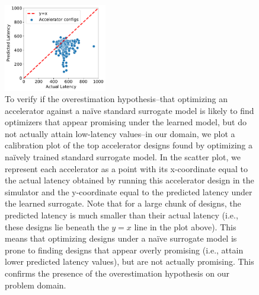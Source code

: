 \begin{figure}[ht]
    \centering
    \includegraphics[width=0.4\textwidth]{figs/results/overestimation.pdf}
    \caption{To verify if the overestimation hypothesis--that optimizing an accelerator against a na\"ive standard surrogate model is likely to find optimizers that appear promising under the learned model, but do not actually attain low-latency values--in our domain, we plot a calibration plot of the top accelerator designs found by optimizing a na\"ively trained standard surrogate model. In the scatter plot, we represent each accelerator as a point with its x-coordinate equal to the actual latency obtained by running this accelerator design in the simulator and the y-coordinate equal to the predicted latency under the learned surrogate. Note that for a large chunk of designs, the predicted latency is much smaller than their actual latency (i.e., these designs lie beneath the $y=x$ line in the plot above). This means that optimizing designs under a na\"ive surrogate model is prone to finding designs that appear overly promising (i.e., attain lower predicted latency values), but are not actually promising. This confirms the presence of the overestimation hypothesis on our problem domain.}
    \label{fig:cali_plot}
    \vspace{-0.1in}
\end{figure}

